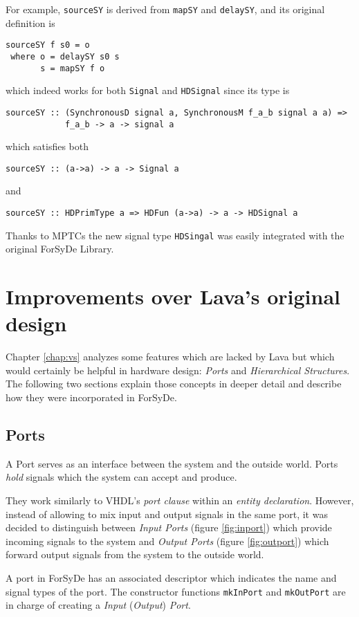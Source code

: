 For example, \texttt{sourceSY} is derived from \texttt{mapSY} and
\texttt{delaySY}, and its original definition is
\begin{lstlisting}
sourceSY f s0 = o
 where o = delaySY s0 s
       s = mapSY f o
\end{lstlisting}
which indeed works for both \texttt{Signal} and \texttt{HDSignal}
since its type is
\begin{lstlisting}
sourceSY :: (SynchronousD signal a, SynchronousM f_a_b signal a a) =>
            f_a_b -> a -> signal a
\end{lstlisting}
which satisfies both
\begin{lstlisting}
sourceSY :: (a->a) -> a -> Signal a
\end{lstlisting}
and
\begin{lstlisting}
sourceSY :: HDPrimType a => HDFun (a->a) -> a -> HDSignal a
\end{lstlisting}

Thanks to MPTCs the new signal type \texttt{HDSingal} was easily
integrated with the original ForSyDe Library.


\section{Improvements over Lava's original design}
Chapter \ref{chap:vs} analyzes some features which are lacked by Lava
but which would certainly be helpful in hardware design:
\textit{Ports} and \textit{Hierarchical Structures}. The following two
sections explain those concepts in deeper detail and describe how they
were incorporated in ForSyDe.


\subsection{Ports}

A Port serves as an interface between the system and the outside
world.  Ports \textit{hold} signals which the system can accept and
produce.

They work similarly to VHDL's \textit{port clause} within an
\textit{entity declaration}. However, instead of allowing to mix input
and output signals in the same port, it was decided to distinguish
between \textit{Input Ports} (figure \ref{fig:inport}) which provide
incoming signals to the system and \textit{Output Ports} (figure
\ref{fig:outport}) which forward output signals from the system to the
outside world.


A port in ForSyDe has an associated descriptor which indicates the
name and signal types of the port. The constructor functions
\texttt{mkInPort} and \texttt{mkOutPort} are in charge of creating a
\textit{Input} (\textit{Output}) \textit{Port}.


